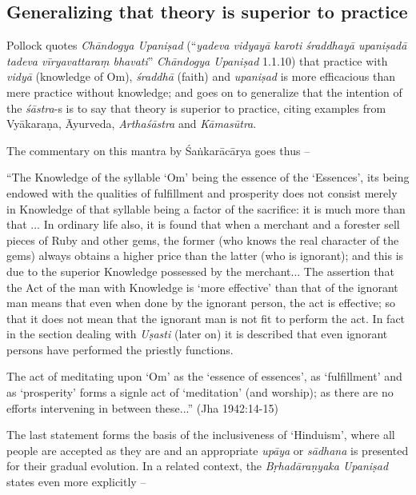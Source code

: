 \subsection{Generalizing that theory is superior to practice}\label{art12-sec3.5}

Pollock quotes {\sl Chāndogya Upaniṣad} (``{\sl yadeva vidyayā karoti śraddhayā upaniṣadā tadeva vīryavattaraṃ bhavati}'' {\sl Chāndogya Upaniṣad} 1.1.10) that practice with {\sl vidyā} (knowledge of Om), {\sl śraddhā} (faith) and {\sl upaniṣad} is more eﬃcacious than mere practice without knowledge; and goes on to generalize that the intention of the {\sl śāstra}-s is to say that theory is superior to practice, citing examples from Vyākaraṇa, Āyurveda, {\sl Arthaśāstra} and {\sl Kāmasūtra}.
\begin{myquote}
The commentary on this mantra by Śaṅkarācārya goes thus --

``The Knowledge of the syllable `Om' being the essence of the `Essences', its being endowed with the qualities of fulﬁllment and prosperity does not consist merely in Knowledge of that syllable being a factor of the sacriﬁce: it is much more than that ... In ordinary life also, it is found that when a merchant and a forester sell pieces of Ruby and other gems, the former (who knows the real character of the gems) always obtains a higher price than the	latter (who is ignorant); and this is due to the superior Knowledge possessed by the merchant... The assertion that the Act of the man with Knowledge is `more effective' than that of the ignorant man means that even when done by the ignorant person, the act is effective; so that it does not mean that the ignorant man is not ﬁt to perform the act. In fact in the section dealing with {\sl Uṣasti} (later on) it is described that even ignorant persons have performed the priestly functions.

The act of meditating upon `Om' as the `essence of essences', as `fulfillment' and as `prosperity' forms a signle act of `meditation' (and worship); as there are no efforts intervening in between these...'' (Jha 1942:14-15)
\end{myquote}

The last statement forms the basis of the inclusiveness of `Hinduism', where all people are accepted as they are and an appropriate {\sl upāya} or {\sl sādhana} is presented for their gradual evolution. In a related context, the {\sl Bṛhadāraṇyaka Upaniṣad} states even more explicitly --

\newpage

